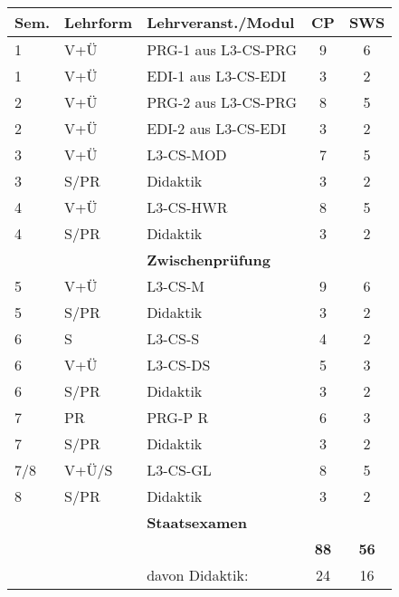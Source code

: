 


\begin{center}
\begin{tabular}{lllcc}

       \textbf{Sem.} & \textbf{Lehrform} & \textbf{Lehrveranst./Modul} & \textbf{CP} & \textbf{SWS} \\ 
\hline 1 &  V+Ü  & PRG-1 aus L3-CS-PRG &  9  &  6  \\
       1 &  V+Ü  & EDI-1 aus L3-CS-EDI &  3  &  2  \\
\hline 2 &  V+Ü  & PRG-2 aus L3-CS-PRG &  8  &  5  \\
       2 &  V+Ü  & EDI-2 aus L3-CS-EDI &  3  &  2  \\
\hline 3 &  V+Ü  & L3-CS-MOD           &  7  &  5  \\
       3 &  S/PR & Didaktik            &  3  &  2  \\
\hline 4 &  V+Ü  & L3-CS-HWR           &  8  &  5  \\
       4 &  S/PR & Didaktik            &  3  &  2  \\

\rowcolor{hellgrau}

\hline   &       & \textbf{Zwischenprüfung}     &     &    \\
\hline 5 &  V+Ü  & L3-CS-M             &  9  &  6  \\
       5 &  S/PR & Didaktik            &  3  &  2  \\
\hline 6 &  S    & L3-CS-S             &  4  &  2  \\
       6 &  V+Ü  & L3-CS-DS            &  5  &  3  \\
       6 &  S/PR & Didaktik            &  3  &  2  \\
\hline 7 &  PR   &  PRG-P R            &  6  &  3  \\
       7 & S/PR  & Didaktik            &  3  &  2  \\
\hline 7/8 & V+Ü/S &  L3-CS-GL         &  8  &  5  \\
       8 & S/PR  & Didaktik            &  3  &  2  \\

\rowcolor{hellgrau}

\hline   &       & \textbf{Staatsexamen}        &     &     \\
\hline   &       &                     & \textbf{88}  &  \textbf{56} \\
         &       & davon Didaktik:     & 24  &  16 \\

\end{tabular}
\end{center}
